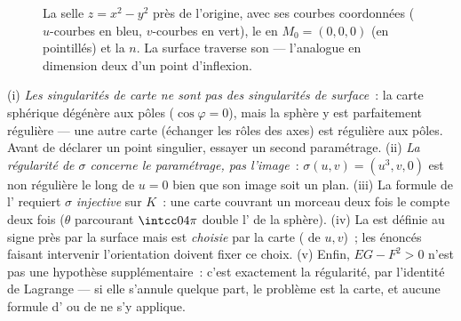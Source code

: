 \begin{figure}[ht]
\centering
{}
\caption{La selle $z = x^2 - y^2$ près de l'origine, avec ses
courbes coordonnées ($u$-courbes en bleu, $v$-courbes en vert), le
 en $M_0 = (0,0,0)$ (en pointillés) et la  $n$. La surface traverse son  --- l'analogue
en dimension deux d'un point d'inflexion.}
\label{fig:b2:surfaces:saddle}
\end{figure}

\begin{remark}
(i) \emph{Les singularités de carte ne sont pas des singularités
de surface}~: la carte sphérique dégénère aux pôles
($\cos\varphi = 0$), mais la sphère y est parfaitement régulière
--- une autre carte (échanger les rôles des axes) est régulière
aux pôles. Avant de déclarer un point singulier, essayer un second
paramétrage. (ii) \emph{La régularité de $\sigma$ concerne
le paramétrage, pas l'image}~: $\sigma(u, v) = (u^3, v,
0)$ est non régulière le long de $u = 0$ bien que son image soit un
plan. (iii) La formule de l' requiert $\sigma$
\emph{injective} sur $K$~: une carte couvrant un morceau deux fois
le compte deux fois ($\theta$ parcourant $\intcc0{4\pi}$
double l' de la sphère). (iv) La  est définie
au signe près par la surface mais est \emph{choisie} par la carte
( de $u, v$)~; les énoncés faisant intervenir l'orientation
doivent fixer ce choix. (v) Enfin, $EG - F^2 > 0$ n'est pas une
hypothèse supplémentaire~: c'est exactement la régularité, par
l'identité de Lagrange --- si elle s'annule quelque part, le
problème est la carte, et aucune formule d' ou de 
ne s'y applique.
\end{remark}

